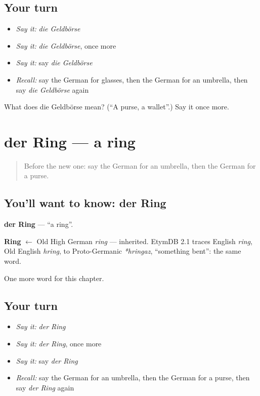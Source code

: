 \subsection*{Your turn}
\begin{itemize}
\raggedright
  \item \emph{Say it:} \emph{die Geldbörse}
  \item \emph{Say it:} \emph{die Geldbörse}, once more
  \item \emph{Say it:} say \emph{die Geldbörse}
  \item \emph{Recall:} say the German for glasses, then the German for an umbrella, then say \emph{die Geldbörse} again
\end{itemize}

\begin{tcolorbox}[breakable,colback=teal!4,colframe=teal!35!black,title={Before you move on}]
What does die Geldbörse mean? (\textquotedblleft{}A purse, a wallet\textquotedblright{}.) Say it once more.
\end{tcolorbox}
\section[der Ring]{der Ring — a ring}

\label{lesson:GE-C117-ring}



\begin{quote}
Before the new one: say the German for an umbrella, then the German for a purse.
\end{quote}

\subsection*{You'll want to know: der Ring}
\textbf{der Ring} — \textquotedblleft{}a ring\textquotedblright{}.

\begin{cousinweb}
\textbf{Ring} $\leftarrow$ Old High German \emph{ring} — inherited. EtymDB 2.1 traces English \emph{ring}, Old English \emph{hring}, to Proto-Germanic \emph{*hringaz}, \textquotedblleft{}something bent\textquotedblright{}: the same word.
\end{cousinweb}

\begin{grammarlens}[title={What you've built}]
One more word for this chapter.
\end{grammarlens}

\subsection*{Your turn}
\begin{itemize}
\raggedright
  \item \emph{Say it:} \emph{der Ring}
  \item \emph{Say it:} \emph{der Ring}, once more
  \item \emph{Say it:} say \emph{der Ring}
  \item \emph{Recall:} say the German for an umbrella, then the German for a purse, then say \emph{der Ring} again
\end{itemize}


